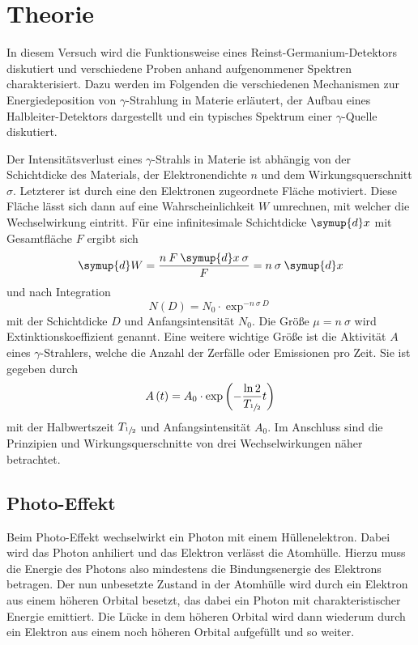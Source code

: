 \section{Theorie}
\label{sec:Theorie}

In diesem Versuch wird die Funktionsweise eines Reinst-Germanium-Detektors diskutiert
und verschiedene Proben anhand aufgenommener Spektren charakterisiert.
Dazu werden im Folgenden die verschiedenen Mechanismen zur Energiedeposition von
$\gamma$-Strahlung in Materie erläutert, der Aufbau eines Halbleiter-Detektors
dargestellt und ein typisches Spektrum einer $\gamma$-Quelle diskutiert.

Der Intensitätsverlust eines $\gamma$-Strahls in Materie ist abhängig von
der Schichtdicke des Materials, der Elektronendichte $n$ und dem
Wirkungsquerschnitt $\sigma$.
Letzterer ist durch eine den Elektronen zugeordnete Fläche motiviert.
Diese Fläche lässt sich dann auf eine Wahrscheinlichkeit $W$ umrechnen,
mit welcher die Wechselwirkung eintritt. Für eine infinitesimale Schichtdicke
$\symup{d}x$ mit Gesamtfläche $F$ ergibt sich
\begin{equation*}
	\symup{d}W = \frac{n\:F\:\symup{d}x\:\sigma}{F} = n\:\sigma\:\symup{d}x
\end{equation*}
und nach Integration
\begin{equation}
	N\left(D\right) = N_\text{0} \cdot \exp^{-n\:\sigma\:D}
	\label{eqn:Intensitaet-Exp}
\end{equation}
mit der Schichtdicke $D$ und Anfangsintensität $N_\text{0}$.
Die Größe $\mu = n\:\sigma$ wird Extinktionskoeffizient genannt.
Eine weitere wichtige Größe ist die Aktivität $A$ eines $\gamma$-Strahlers,
welche die Anzahl der Zerfälle oder Emissionen pro Zeit.
Sie ist gegeben durch
\begin{equation}
	A\left(t\right) = A_0 \cdot \exp\left(-\frac{\ln 2}{T_{\sfrac{1}{2}}} t\right)
	\label{eqn:AktivitaetFormel}
\end{equation}
mit der Halbwertszeit $T_{\sfrac{1}{2}}$ und Anfangsintensität $A_0$.
Im Anschluss sind die Prinzipien und Wirkungsquerschnitte von drei
Wechselwirkungen näher betrachtet.

\subsection{Photo-Effekt}
\label{sec:Photo-Effekt}

Beim Photo-Effekt wechselwirkt ein Photon mit einem Hüllenelektron. Dabei
wird das Photon anhiliert und das Elektron verlässt die Atomhülle.
Hierzu muss die Energie des Photons also mindestens die Bindungsenergie des
Elektrons betragen.
Der nun unbesetzte Zustand in der Atomhülle wird durch ein Elektron aus
einem höheren Orbital besetzt, das dabei ein Photon mit charakteristischer
Energie emittiert. Die Lücke in dem höheren Orbital wird dann wiederum durch
ein Elektron aus einem noch höheren Orbital aufgefüllt und so weiter.

